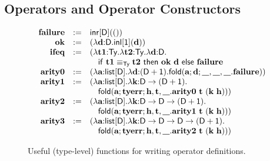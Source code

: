 \documentclass[9pt,preprint]{sigplanconf}
\begin{document}
\subsection{Operators and Operator Constructors}\label{opcons}
\begin{figure}[t]
\small
\[
\begin{array}{rcl}
{\textbf{failure}} & := & {\sf inr}[\textsf{D}](())\\
{\textbf{ok}} & := & (\lambda {\textbf{d}}{:}{\textsf{D}}.{\sf inl}[\textsf{1}]({\textbf{d}}))\\
{\textbf{ifeq}} & := & (\lambda {\textbf{t1}}{:}{\textsf{Ty}}.\lambda {\textbf{t2}}{:}{\textsf{Ty}}.\lambda {\textbf{d}}{:}{\textsf{D}}.
	\\& & \quad {\sf if}~{\textbf{t1}}\equiv_{\textsf{Ty}}{\textbf{t2}}{\sf ~then~}{\textbf{ok}}~{\textbf{d}}~{\sf else}~{\textbf{failure}}\\
{\textbf{arity0}} & := & (\lambda {\textbf{a}}{:}{\textsf{list}[\textsf{D}]}.\lambda {\textbf{d}}{:}{(\textsf{D}+ \textsf{1})}.{\sf fold}({\textbf{a}}; {\textbf{d}}; {\textbf{\_}},{\textbf{\_}},{\textbf{\_}}.{\textbf{failure}}))\\
{\textbf{arity1}} & := & (\lambda {\textbf{a}}{:}{\textsf{list}[\textsf{D}]}.\lambda {\textbf{k}}{:}{\textsf{D}\rightarrow{(\textsf{D}+ \textsf{1})}}.
	\\ & & \quad {\sf fold}({\textbf{a}}; {\textbf{tyerr}}; {\textbf{h}},{\textbf{t}},{\textbf{\_}}.
 {\textbf{arity0}}~{\textbf{t}}~({\textbf{k}}~{\textbf{h}})))\\
{\textbf{arity2}} & := & (\lambda {\textbf{a}}{:}{\textsf{list}[\textsf{D}]}.\lambda {\textbf{k}}{:}{\textsf{D}\rightarrow{\textsf{D}\rightarrow{(\textsf{D}+ \textsf{1})}}}.
	\\ & & \quad {\sf fold}({\textbf{a}}; {\textbf{tyerr}}; {\textbf{h}},{\textbf{t}},{\textbf{\_}}.
 {\textbf{arity1}}~{\textbf{t}}~({\textbf{k}}~{\textbf{h}})))\\
 {\textbf{arity3}} & := & (\lambda {\textbf{a}}{:}{\textsf{list}[\textsf{D}]}.\lambda {\textbf{k}}{:}{\textsf{D}\rightarrow{\textsf{D}\rightarrow{\textsf{D}\rightarrow{(\textsf{D}+ \textsf{1})}}}}.
	\\ & & \quad {\sf fold}({\textbf{a}}; {\textbf{tyerr}}; {\textbf{h}},{\textbf{t}},{\textbf{\_}}.
 {\textbf{arity2}}~{\textbf{t}}~({\textbf{k}}~{\textbf{h}})))

\end{array}
\]
\caption{\small Useful (type-level) functions for writing operator definitions.}
\vspace{-10pt}
\label{helpers}
\end{figure}
\end{document}
